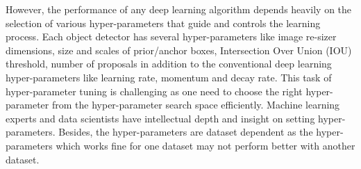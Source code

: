 \documentclass[thesis]{mas_proposal}
\begin{document}
However, the performance of any deep learning algorithm depends heavily on the selection of various hyper-parameters that guide and controls the learning process. Each object detector has several hyper-parameters like image re-sizer dimensions, size and scales of prior/anchor boxes, Intersection Over Union (IOU) threshold, number of proposals in addition to the conventional deep learning hyper-parameters like learning rate, momentum and decay rate. This task of hyper-parameter tuning is challenging as one need to choose the right hyper-parameter from the hyper-parameter search space efficiently. Machine learning experts and data scientists have intellectual depth and insight on setting hyper-parameters. Besides, the hyper-parameters are dataset dependent as the hyper-parameters which works fine for one dataset may not perform better with another dataset\cite{automl_book}.
\end{document}
